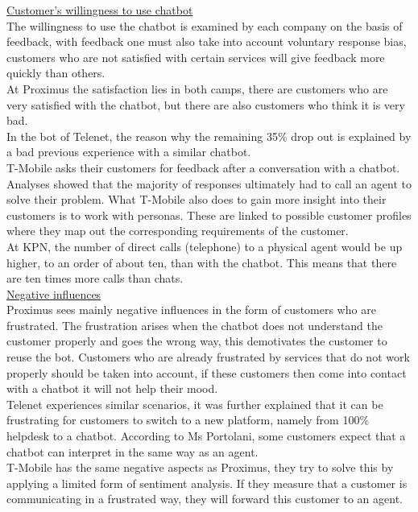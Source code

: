 \break
\ul{Customer's willingness to use chatbot}\\
The willingness to use the chatbot is examined by each company on the basis of feedback, with feedback one must also take into account voluntary response bias, customers who are not satisfied with certain services will give feedback more quickly than others.\\
\break
At Proximus the satisfaction lies in both camps, there are customers who are very satisfied with the chatbot, but there are also customers who think it is very bad.\\ 
\break
In the bot of Telenet, the reason why the remaining 35\% drop out is explained by a bad previous experience with a similar chatbot.\\ 
\break
T-Mobile asks their customers for feedback after a conversation with a chatbot. Analyses showed that the majority of responses ultimately had to call an agent to solve their problem. What T-Mobile also does to gain more insight into their customers is to work with personas. These are linked to possible customer profiles where they map out the corresponding requirements of the customer.\\ 
\break
At KPN, the number of direct calls (telephone) to a physical agent would be up higher, to an order of about ten, than with the chatbot. This means that there are ten times more calls than chats.\\
\break
\ul{Negative influences}\\
Proximus sees mainly negative influences in the form of customers who are frustrated. The frustration arises when the chatbot does not understand the customer properly and goes the wrong way, this demotivates the customer to reuse the bot. Customers who are already frustrated by services that do not work properly should be taken into account, if these customers then come into contact with a chatbot it will not help their mood.\\
\break
Telenet experiences similar scenarios, it was further explained that it can be frustrating for customers to switch to a new platform, namely from 100\% helpdesk to a chatbot. According to Ms Portolani, some customers expect that a chatbot can interpret in the same way as an agent.\\
\break
T-Mobile has the same negative aspects as Proximus, they try to solve this by applying a limited form of sentiment analysis. If they measure that a customer is communicating in a frustrated way, they will forward this customer to an agent.\\
